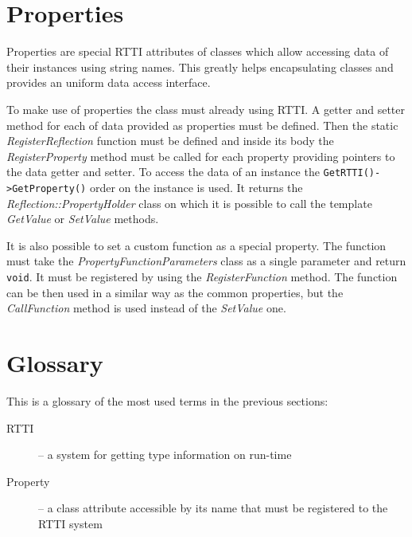 \section{Properties}
\label{sec:utils-properties}
Properties are special RTTI attributes of classes which allow accessing data of their instances using string names. This greatly helps encapsulating classes and provides an uniform data access interface.

To make use of properties the class must already using RTTI. A getter and setter method for each of data provided as properties must be defined. Then the static \emph{RegisterReflection} function must be defined and inside its body the \emph{RegisterProperty} method must be called for each property providing pointers to the data getter and setter. To access the data of an instance the \verb/GetRTTI()->GetProperty()/ order on the instance is used. It returns the \emph{Reflection::PropertyHolder} class on which it is possible to call the template \emph{GetValue} or \emph{SetValue} methods.

It is also possible to set a custom function as a special property. The function must take the \emph{PropertyFunctionParameters} class as a single parameter and return \verb/void/. It must be registered by using the \emph{RegisterFunction} method. The function can be then used in a similar way as the common properties, but the \emph{CallFunction} method is used instead of the \emph{SetValue} one.


\section{Glossary}
This is a glossary of the most used terms in the previous sections:

\begin{description}
  \item[RTTI] -- a system for getting type information on run-time
  \item[Property] -- a class attribute accessible by its name that must be registered to the RTTI system
\end{description}



